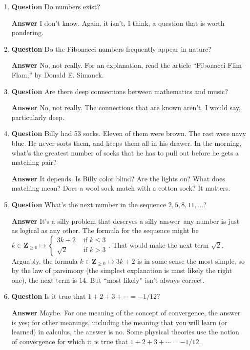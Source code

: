 \documentclass[12pt]{article}
\newcounter{ex}\setcounter{ex}{0}
\newcounter{cd}\setcounter{cd}{24}
\begin{document}
\begin{enumerate}
\item  \textbf{Question} Do numbers exist?

  \textbf{Answer} I don't know. Again, it isn't, I think, a question that is worth pondering.

\item  \textbf{Question} Do the Fibonacci numbers frequently appear in nature?

\textbf{Answer}  No, not really.  For an explanation, read the article ``Fibonacci Flim-Flam,'' by Donald E. Simanek.

\item  \textbf{Question} Are there deep connections between mathematics and music? 

  \textbf{Answer}  No, not really. The connections that are known aren't, I would say, particularly deep.

\item  \textbf{Question}  Billy had 53 socks.  Eleven of them were brown.  The rest were navy blue.  He never sorts them, and keeps them all in his drawer.  In the morning, what's the greatest number of socks that he has to pull out before he gets a matching pair?

  \textbf{Answer} It depends. Is Billy color blind?  Are the lights on? What does matching mean? Does a wool sock match with a cotton sock? It matters.

\item  \textbf{Question} What's the next number in the sequence  \(2,5,8,11, \dots \)?

  \textbf{Answer}  It's a silly problem that deserves a silly answer--any number is just as logical as any other. 
The formula for the sequence might be \(k \in \mathbf{Z}_{\geq 0} \mapsto \begin{cases} 3 k +2 & \mbox{ if } k \leq 3
 \\ \sqrt{2} & \mbox{ if } k >  3 \end{cases} \). That would make the next term \(\sqrt{2} \). 
 Arguably, the formula  \(k \in \mathbf{Z}_{\geq 0}  \mapsto 3 k +2 \) is in some 
 sense the most simple, so by the law of parsimony 
 (the simplest explanation is most likely the right one), the next 
 term is 14. But ``most likely'' isn't always correct.

\item  \textbf{Question} Is it true that \(1 + 2 + 3 + \cdots = -1/12\)?

  \textbf{Answer}  Maybe. For one meaning of the concept of convergence, the answer is yes; for other meanings, including the meaning that you will learn (or learned)  in calculus, the answer is no.  Some physical theories use the notion of convergence for which it is true that \(1 + 2 + 3 + \cdots = -1/12\).


\end{enumerate}
\end{document}
